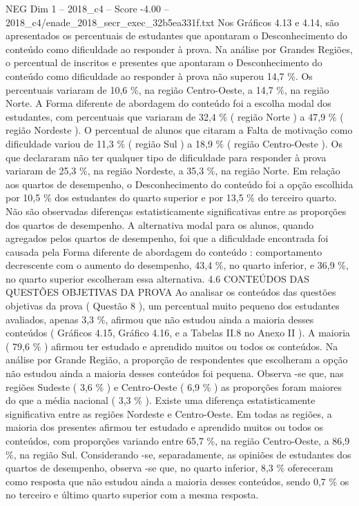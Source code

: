 \begin{textsample}{NEG Dim 1 – 2018\_c4 – Score -4.00 – 2018\_c4/enade\_2018\_secr\_exec\_32b5ea331f.txt}
Nos Gráficos 4.13 e 4.14, são apresentados os percentuais de estudantes que apontaram o Desconhecimento do conteúdo como dificuldade ao responder à prova.
Na análise por Grandes Regiões, o percentual de inscritos e presentes que apontaram o Desconhecimento do conteúdo como dificuldade ao responder à prova não superou 14,7 \%.
Os percentuais variaram de 10,6 \%, na região Centro-Oeste, a 14,7 \%, na região Norte.
A Forma diferente de abordagem do conteúdo foi a escolha modal dos estudantes, com percentuais que variaram de 32,4 \% ( região Norte ) a 47,9 \% ( região Nordeste ).
O percentual de alunos que citaram a Falta de motivação como dificuldade variou de 11,3 \% ( região Sul ) a 18,9 \% ( região Centro-Oeste ).
Os que declararam não ter qualquer tipo de dificuldade para responder à prova variaram de 25,3 \%, na região Nordeste, a 35,3 \%, na região Norte.
Em relação aos quartos de desempenho, o Desconhecimento do conteúdo foi a opção escolhida por 10,5 \% dos estudantes do quarto superior e por 13,5 \% do terceiro quarto.
Não são observadas diferenças estatisticamente significativas entre as proporções dos quartos de desempenho.
A alternativa modal para os alunos, quando agregados pelos quartos de desempenho, foi que a dificuldade encontrada foi causada pela Forma diferente de abordagem do conteúdo : comportamento decrescente com o aumento do desempenho, 43,4 \%, no quarto inferior, e 36,9 \%, no quarto superior escolheram essa alternativa. 4.6 CONTEÚDOS DAS QUESTÕES OBJETIVAS DA PROVA Ao analisar os conteúdos das questões objetivas da prova ( Questão 8 ), um percentual muito pequeno dos estudantes avaliados, apenas 3,3 \%, afirmou que não estudou ainda a maioria desses conteúdos ( Gráficos 4.15, Gráfico 4.16, e a Tabelas II.8 no Anexo II ).
A maioria ( 79,6 \% ) afirmou ter estudado e aprendido muitos ou todos os conteúdos.
Na análise por Grande Região, a proporção de respondentes que escolheram a opção não estudou ainda a maioria desses conteúdos foi pequena.
Observa -se que, nas regiões Sudeste ( 3,6 \% ) e Centro-Oeste ( 6,9 \% ) as proporções foram maiores do que a média nacional ( 3,3 \% ).
Existe uma diferença estatisticamente significativa entre as regiões Nordeste e Centro-Oeste.
Em todas as regiões, a maioria dos presentes afirmou ter estudado e aprendido muitos ou todos os conteúdos, com proporções variando entre 65,7 \%, na região Centro-Oeste, a 86,9 \%, na região Sul.
Considerando -se, separadamente, as opiniões de estudantes dos quartos de desempenho, observa -se que, no quarto inferior, 8,3 \% ofereceram como resposta que não estudou ainda a maioria desses conteúdos, sendo 0,7 \% os no terceiro e último quarto superior com a mesma resposta.

\end{textsample}
